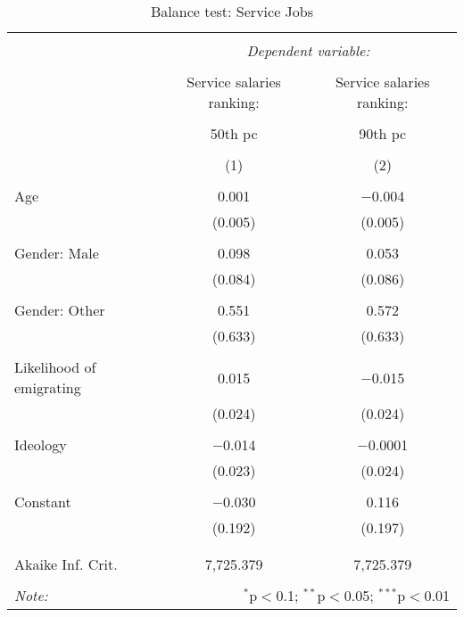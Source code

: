 \documentclass[12pt]{article}
\begin{document}
\begin{appendices}
\begin{table}[!htbp] \centering 
  \caption{Balance test: Service Jobs} 
  \label{tab:balance3} 
\begin{tabular}{@{\extracolsep{5pt}}lcc} 
\\[-1.8ex]\hline 
\hline \\[-1.8ex] 
 & \multicolumn{2}{c}{\textit{Dependent variable:}} \\ 
\cline{2-3} 
\\[-1.8ex] & Service salaries ranking: & Service salaries ranking: \\ 
\\[-1.8ex] & 50th pc &  90th pc \\ 
\\[-1.8ex] & (1) & (2)\\ 
\hline \\[-1.8ex] 
 Age & 0.001 & $-$0.004 \\ 
  & (0.005) & (0.005) \\ 
  & & \\ 
 Gender: Male & 0.098 & 0.053 \\ 
  & (0.084) & (0.086) \\ 
  & & \\ 
 Gender: Other & 0.551 & 0.572 \\ 
  & (0.633) & (0.633) \\ 
  & & \\ 
 Likelihood of emigrating & 0.015 & $-$0.015 \\ 
  & (0.024) & (0.024) \\ 
  & & \\ 
 Ideology & $-$0.014 & $-$0.0001 \\ 
  & (0.023) & (0.024) \\ 
  & & \\ 
 Constant & $-$0.030 & 0.116 \\ 
  & (0.192) & (0.197) \\ 
  & & \\ 
\hline \\[-1.8ex] 
Akaike Inf. Crit. & 7,725.379 & 7,725.379 \\ 
\hline 
\hline \\[-1.8ex] 
\textit{Note:}  & \multicolumn{2}{r}{$^{*}$p$<$0.1; $^{**}$p$<$0.05; $^{***}$p$<$0.01} \\ 
\end{tabular} 
\end{table} 


\end{appendices}
\end{document}
